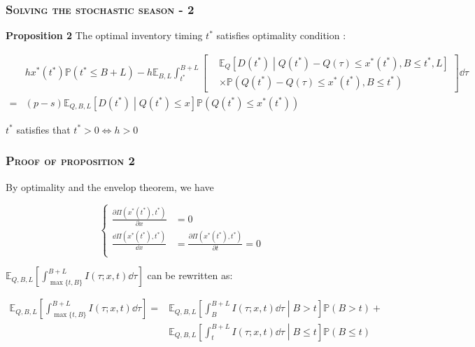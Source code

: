 \documentclass[aspectratio=169]{../presentation}
\begin{document}
    \begin{frame}
        \frametitle{\textsc{Solving the stochastic season - 2}}

        \textrm{\bfseries Proposition 2} The optimal inventory timing $t^*$ satisfies optimality condition :

        \begin{equation}
            \begin{aligned}
                & hx^*\left(t^*\right)\mathbb P(t^*\leq B+L) - h\mathbb E_{B, L}\int_{t^*}^{B+L} \left[\begin{aligned}
                    & \mathbb E_Q \left[D\left(t^*\right)\middle | Q\left(t^*\right) - Q(\tau)\leq x^*\left(t^*\right), B\leq t^*, L\right] \\
                    & \times \mathbb P\left(Q\left(t^*\right) - Q(\tau)\leq x^*\left(t^*\right), B\leq t^*\right)
                \end{aligned}\right] \dd \tau \\
                =& (p-s)\mathbb E_{Q, B, L}\left[D\left(t^*\right)\middle | Q\left(t^*\right)\leq x\right]\mathbb P\left(Q\left(t^*\right)\leq x^*\left(t^*\right)\right)
            \end{aligned}
            \label{eq:3}
        \end{equation}

        $t^*$ satisfies that $t^* > 0\Leftrightarrow h > 0$

    \end{frame}

    \begin{frame}
        \frametitle{\textsc{Proof of proposition 2}}

        By optimality and the envelop theorem, we have

        \begin{equation}
            \left\{
            \begin{aligned}
                \frac{\partial \Pi(x^*(t^*), t^*)}{\partial x} &= 0 \\
                \frac{\dd\Pi(x^*(t^*), t^*)}{\dd x} &= \frac{\partial \Pi(x^*(t^*), t^*)}{\partial t} = 0 \\
            \end{aligned}
            \right.
        \end{equation}

        $\mathbb E_{Q, B, L}\left[\int_{\max\{t, B\}}^{B+L} I(\tau; x, t)\dd \tau\right]$ can be rewritten as:

        \begin{equation}
            \begin{aligned}
            \mathbb E_{Q, B, L}\left[\int_{\max\{t, B\}}^{B+L} I(\tau; x, t)\dd \tau\right] =& \mathbb E_{Q, B, L}\left[\int_B^{B+L} I(\tau; x, t)\dd \tau\middle| B > t\right]\mathbb P(B > t) + \\
            & \mathbb E_{Q, B, L}\left[\int_t^{B+L} I(\tau; x, t)\dd \tau\middle| B \leq t\right]\mathbb P(B \leq t)
            \end{aligned}
        \end{equation}

    \end{frame}
\end{document}
